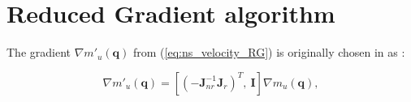 











 





	
	






 



\section{Reduced Gradient algorithm}
\label{sec:1D2D}


The gradient $\nabla m'_u(\mathbf{q})$  from (\ref{eq:ns_velocity_RG}) is originally  chosen in \cite{reduced_gradient} as : 

\begin{equation}
 \nabla m'_u(\mathbf{q}) =  \left[(-\mathbf{J}_{nr}^{-1} \mathbf{J}_r)^{T}, \   \mathbf{I} \right ] \nabla m_u(\mathbf{q})
 ,
\label{eq:RG_deLuca}
\end{equation}






